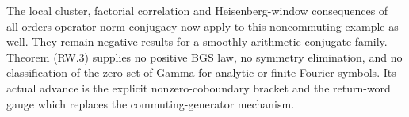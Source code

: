 The local cluster, factorial correlation and Heisenberg-window consequences of all-orders operator-norm conjugacy now apply to this noncommuting example as well. They remain negative results for a smoothly arithmetic-conjugate family. Theorem (RW.3) supplies no positive BGS law, no symmetry elimination, and no classification of the zero set of Gamma for analytic or finite Fourier symbols. Its actual advance is the explicit nonzero-coboundary bracket and the return-word gauge which replaces the commuting-generator mechanism.
